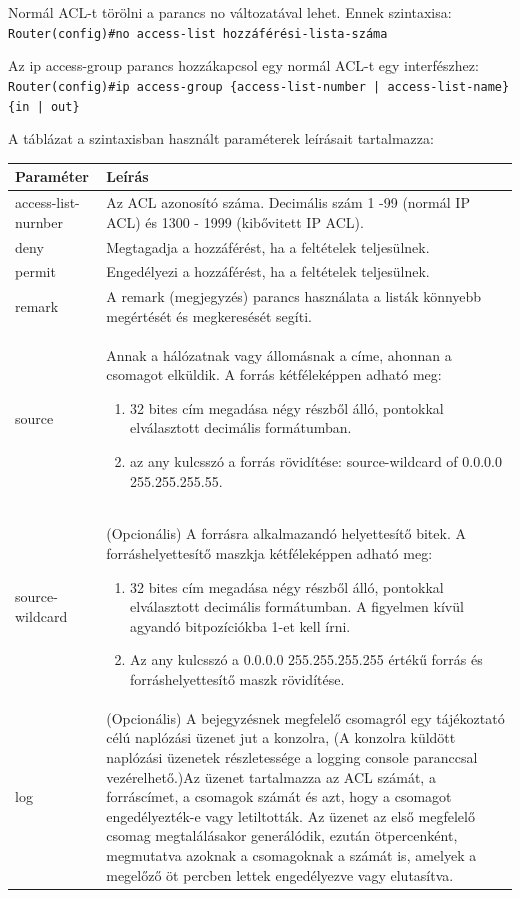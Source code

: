 Normál ACL-t törölni a parancs no változatával lehet. Ennek szintaxisa:\\
\verb|Router(config)#no access-list hozzáférési-lista-száma|

Az ip access-group parancs hozzákapcsol egy normál ACL-t egy interfészhez:
\verb+Router(config)#ip access-group {access-list-number | access-list-name} {in | out}+

A táblázat a szintaxisban használt paraméterek leírásait tartalmazza:\\
\begin{tabularx}{\linewidth}{l|X}
	Paraméter & Leírás\\
	\hline
	access-list-nurnber & Az ACL azonosító száma. Decimális szám 1 -99 (normál IP ACL) és 1300 - 1999 (kibővitett IP ACL).\\[1pt]
	deny & Megtagadja a hozzáférést, ha a feltételek teljesülnek.\\[1pt]
	permit & Engedélyezi a hozzáférést, ha a feltételek teljesülnek.\\[1pt]
	remark & A remark (megjegyzés) parancs használata a listák könnyebb megértését és megkeresését segíti.\\[1pt]
	source & Annak a hálózatnak vagy állomásnak a címe, ahonnan a csomagot elküldik. A forrás kétféleképpen adható meg:
		\begin{enumerate}[nosep]
		\item 32 bites cím megadása négy részből álló, pontokkal elválasztott decimális formátumban.
		\item az any kulcsszó a forrás rövidítése: source-wildcard of 0.0.0.0 255.255.255.55.
		\end{enumerate}\\
	source-wildcard & (Opcionális) A forrásra alkalmazandó helyettesítő bitek. A forráshelyettesítő maszkja kétféleképpen adható meg:
	\begin{enumerate}[nosep]
	\item 32 bites cím megadása négy részből álló, pontokkal elválasztott decimális formátumban. A figyelmen kívül agyandó bitpozíciókba 1-et kell írni.
	\item Az any kulcsszó a 0.0.0.0 255.255.255.255 értékű forrás és forráshelyettesítő maszk rövidítése.
	\end{enumerate}\\
	log & (Opcionális) A bejegyzésnek megfelelő csomagról egy tájékoztató célú naplózási üzenet jut a konzolra, (A konzolra küldött naplózási üzenetek részletessége a logging console paranccsal vezérelhető.)Az üzenet tartalmazza az ACL számát, a forráscímet, a csomagok számát és azt, hogy a csomagot engedélyezték-e vagy letiltották. Az üzenet az első megfelelő csomag megtalálásakor generálódik, ezután ötpercenként, megmutatva azoknak a csomagoknak a számát is, amelyek a megelőző öt percben lettek engedélyezve vagy elutasítva.
\end{tabularx}

